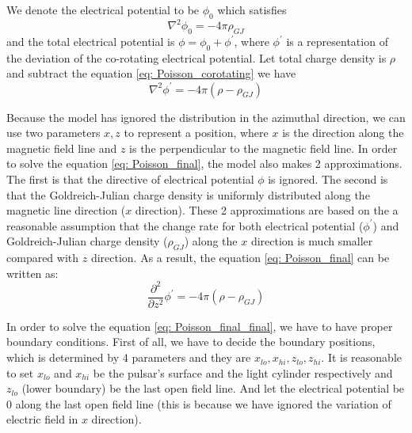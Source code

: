 \documentclass[12pt]{report}
\newcommand{\gj}[0]{
  Goldreich-Julian charge density
}
\begin{document}
      We denote the electrical potential to be $\phi_{0}$ which satisfies 
      \begin{equation}
        \label{eq: Poisson_corotating}
        \nabla^{2}\phi_{0} = -4\pi\rho_{GJ}
      \end{equation}
      and the total electrical potential is $\phi = \phi_{0} + \phi^{\prime}$, where $\phi^{\prime}$ is a 
      representation of the deviation of the co-rotating electrical potential.  
      Let total charge density is $\rho$ and subtract the equation \ref{eq: Poisson_corotating} we have 
      \begin{equation}
        \label{eq: Poisson_final}
        \nabla^{2}\phi^{\prime} = -4\pi\left(\rho - \rho_{GJ} \right)
      \end{equation}

      Because the model has ignored the distribution in the azimuthal direction, we can use two parameters 
      $x, z$ to represent a position, where $x$ is the direction along the magnetic field line and $z$ is the 
      perpendicular to the magnetic field line. In order to solve the equation \ref{eq: Poisson_final}, 
      the model also makes 2 approximations. The first is that the directive of electrical potential $\phi$ 
      is ignored. The second is that the \gj{} is uniformly distributed along the magnetic line direction 
      ($x$ direction). These 2 approximations are based on the a reasonable assumption that the change rate 
      for both electrical potential ($\phi^{\prime}$) and \gj{}($\rho_{GJ}$) along the $x$ direction is much 
      smaller compared with $z$ direction. 
      As a result, the equation \ref{eq: Poisson_final} can be written as: 
      \begin{equation}
        \label{eq: Poisson_final_final}
        \frac{\partial^2}{\partial z^2} \phi^{\prime} = -4\pi\left(\rho - \rho_{GJ} \right)
      \end{equation}

      In order to solve the equation \ref{eq: Poisson_final_final}, we have to have proper boundary conditions. 
      First of all, we have to decide the boundary positions, which is determined by 4 parameters and they are  
      $x_{lo}, x_{hi}, z_{lo}, z_{hi}$. It is reasonable to set $x_{lo}$ and $x_{hi}$
      be the pulsar's surface and the light cylinder respectively and $z_{lo}$ (lower boundary) be the last open 
      field line. And let the electrical potential be $0$ along the last open field line (this is because we have 
      ignored the variation of electric field in $x$ direction).   
\end{document}
